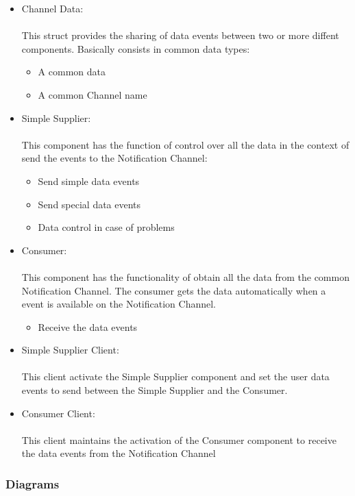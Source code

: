 \begin{itemize}

\item Channel Data:\\\\ This struct provides the sharing of data events between
two or more diffent components. Basically consists in common data types:
 	 \begin{itemize}
 	 	\item A common data
 	 	\item A common Channel name
 	 \end{itemize}

\item Simple Supplier:\\\\ This component has the function of control over all
the data in the context of send the events to the Notification Channel:
 	 \begin{itemize}
 	 	\item Send simple data events
 	 	\item Send special data events
 	 	\item Data control in case of problems
 	 \end{itemize}
\item Consumer:\\\\ This component has the functionality of obtain all the data
from the common Notification Channel. The consumer gets the data automatically
when a event is available on the Notification Channel.
 	 \begin{itemize}
 	 	\item Receive the data events
      \end{itemize}      

\item Simple Supplier Client:\\\\ This client activate the Simple Supplier
component and set the user data events to send between the Simple Supplier and
the Consumer.

\item Consumer Client:\\\\ This client maintains the activation of the Consumer
component to receive the data events from the Notification Channel

\end{itemize}

\subsubsection{Diagrams}

